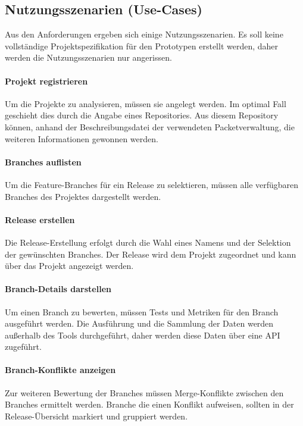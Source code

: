 \subsection{Nutzungsszenarien (Use-Cases)}

Aus den Anforderungen ergeben sich einige Nutzungsszenarien. Es soll keine vollständige Projektspezifikation für den Prototypen erstellt werden, daher werden die Nutzungsszenarien nur angerissen. 

\paragraph{Projekt registrieren}
Um die Projekte zu analysieren, müssen sie angelegt werden. Im optimal Fall geschieht dies durch die Angabe eines Repositories. Aus diesem Repository können, anhand der Beschreibungsdatei der verwendeten Packetverwaltung, die weiteren Informationen gewonnen werden.

\paragraph{Branches auflisten}
Um die Feature-Branches für ein Release zu selektieren, müssen alle verfügbaren Branches des Projektes dargestellt werden. 

\paragraph{Release erstellen}
Die Release-Erstellung erfolgt durch die Wahl eines Namens und der Selektion der gewünschten Branches. Der Release wird dem Projekt zugeordnet und kann über das Projekt angezeigt werden.

\paragraph{Branch-Details darstellen}
Um einen Branch zu bewerten, müssen Tests und Metriken für den Branch ausgeführt werden. Die Ausführung und die Sammlung der Daten werden außerhalb des Tools durchgeführt, daher werden diese Daten über eine API zugeführt.

\paragraph{Branch-Konflikte anzeigen}
Zur weiteren Bewertung der Branches müssen Merge-Konflikte zwischen den Branches ermittelt werden. Branche die einen Konflikt aufweisen, sollten in der Release-Übersicht markiert und gruppiert werden.

